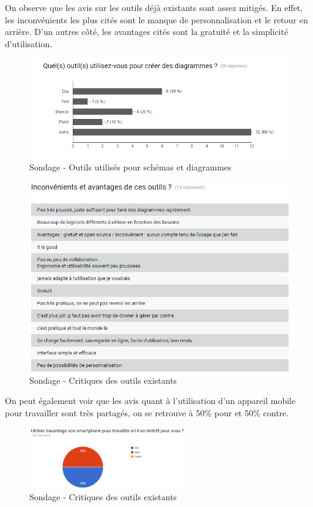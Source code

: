 On observe que les avis sur les outils déjà existants sont assez mitigés. En effet, les inconvénients les plus cités sont le manque de personnalisation et le retour en arrière. D'un autres côté, les avantages cités sont la gratuité et la simplicité d'utilisation. 

\begin{figure}[!h]
	\centering
	\includegraphics[width=\textwidth]{img/sondage_outils}
	\caption{Sondage - Outils utilisés pour schémas et diagrammes}
\end{figure}


\begin{figure}[!h]
	\centering
	\includegraphics[width=\textwidth]{img/sondage_critique}
	\caption{Sondage - Critiques des outils existants}
\end{figure}
\vspace{200pt}
  

On peut également voir que les avis quant à l'utilisation d'un appareil mobile pour travailler sont très partagés, on se retrouve à 50\% pour et 50\% contre.


\begin{figure}[!h]
	\centering
	\includegraphics[width=0.6\textwidth]{img/sondage_smartphone}
	\caption{Sondage - Critiques des outils existants}
\end{figure}

